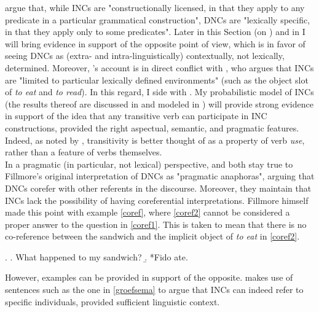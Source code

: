 \textcite[55]{TonelliDelmonte2011} argue that, while INCs are "constructionally licensed, in that they apply to any predicate in a particular grammatical construction", DNCs are "lexically specific, in that they apply only to some predicates". Later in this Section (on ) and in  I will bring evidence in support of the opposite point of view, which is in favor of seeing DNCs as (extra- and intra-linguistically) contextually, not lexically, determined. Moreover, \textcite{TonelliDelmonte2011}'s account is in direct conflict with \textcite[95]{Fillmore1986}, who argues that INCs are "limited to particular lexically defined environments" (such as the object slot of \textit{to eat} and \textit{to read}). In this regard, I side with \textcite{TonelliDelmonte2011}. My probabilistic model of INCs (the results thereof are discussed in  and modeled in ) will provide strong evidence in support of the idea that any transitive verb can participate in INC constructions, provided the right aspectual, semantic, and pragmatic features. Indeed, as noted by \textcite[216]{HuddlestonEtAl2002}, transitivity is better thought of as a property of verb \textit{use}, rather than a feature of verbs themselves.\\
In a pragmatic (in particular, not lexical) perspective, \textcite[44]{AnderBois} and \textcite[53-54]{Melchin2019} both stay true to Fillmore's original interpretation of DNCs as "pragmatic anaphoras", arguing that DNCs corefer with other referents in the discourse. Moreover, they maintain that INCs lack the possibility of having coreferential interpretations. Fillmore himself \parencite[97]{Fillmore1986} made this point with example \ref{coref}, where \ref{coref2} cannot be considered a proper answer to the question in \ref{coref1}. This is taken to mean that there is no co-reference between the sandwich and the implicit object of \textit{to eat} in \ref{coref2}.

\ex. \label{coref} \a. \label{coref1} What happened to my sandwich?
\b. \label{coref2} *Fido ate.

However, examples can be provided in support of the opposite. \textcite[142-144]{groefsema1995understood} makes use of sentences such as the one in \ref{groefsema} to argue that INCs can indeed refer to specific individuals, provided sufficient linguistic context.


